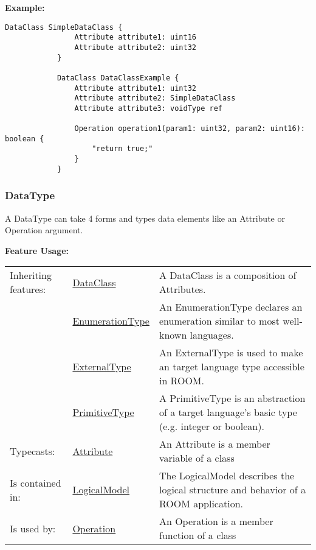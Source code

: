 		
		\textbf{Example:}
		
			\begin{lstlisting}[language=ROOM]
			DataClass SimpleDataClass {
				Attribute attribute1: uint16
				Attribute attribute2: uint32
			}
			
			DataClass DataClassExample {
				Attribute attribute1: uint32
				Attribute attribute2: SimpleDataClass
				Attribute attribute3: voidType ref
				
				Operation operation1(param1: uint32, param2: uint16): boolean {
					"return true;"
				}
			}
			\end{lstlisting}
	
	\vspace{\baselineskip}
	\vspace{\baselineskip}
	\vspace{\baselineskip}
	
	\subsubsection{DataType}
		\hypertarget{ref:DataType}{}
		
		A DataType can take 4 forms and types data elements like an Attribute or Operation argument.
		
		
		
		
		\begingroup
		\textbf{Feature Usage:}
		\renewcommand{\arraystretch}{1.8} %
		\begin{longtable}{l|l p{}}
			\hline
		Inheriting features: & \tabitem \hyperlink{ref:DataClass}{DataClass}  & A DataClass is a composition of Attributes.\\
		& \tabitem \hyperlink{ref:EnumerationType}{EnumerationType}  & An EnumerationType declares an enumeration similar to most well-known languages. \\
		& \tabitem \hyperlink{ref:ExternalType}{ExternalType}  & An ExternalType is used to make an target language type accessible in ROOM. \\
		& \tabitem \hyperlink{ref:PrimitiveType}{PrimitiveType}  & A PrimitiveType is an abstraction of a target language's basic type (e.g. integer or boolean). \\
		\hline
		Typecasts: & \tabitem \hyperlink{ref:Attribute}{Attribute}  & An Attribute is a member variable of a class\\
		\hline
		Is contained in: & \tabitem \hyperlink{ref:LogicalModel}{LogicalModel}  & The LogicalModel describes the logical structure and behavior of a ROOM application.\\
		\hline
		Is used by: & \tabitem \hyperlink{ref:Operation}{Operation}  & An Operation is a member function of a class\\
		\hline
		\end{longtable}
		\endgroup
		
